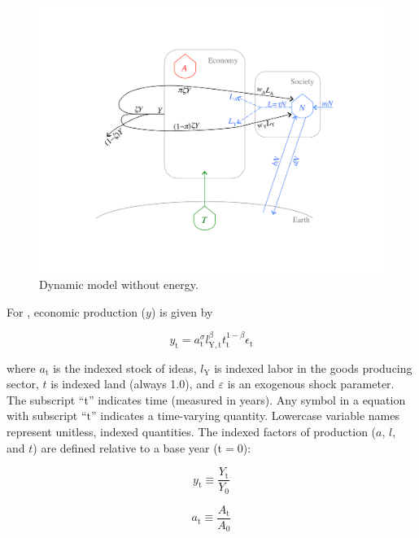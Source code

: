 \documentclass[letterpaper,12pt]{article}
\begin{document}
\begin{figure} \label{fig:ModelWithoutEnergy}
  \begin{center}
    \includegraphics[width=\textwidth]{figure_other/ModelWithoutEnergy.pdf}
    \caption{Dynamic model without energy.}
  \end{center}
\end{figure}

For \citet{Jones:2001wn}, economic production ($y$) is given by

\begin{equation} \label{eq:Jones_production_function}
	y_\mathrm{t} = a_\mathrm{t} ^\sigma l_\mathrm{Y,t} ^\beta t_\mathrm{t} ^{1-\beta} \epsilon_\mathrm{t}
\end{equation}

\noindent where $a_\mathrm{t}$ is the indexed stock of ideas, $l_\mathrm{Y}$ is indexed labor in the goods producing sector, $t$ is indexed land (always 1.0), and $\varepsilon$ is an exogenous shock parameter. The subscript ``t'' indicates time (measured in years). Any symbol in a equation with subscript ``$\mathrm{t}$'' indicates a time-varying quantity. Lowercase variable names represent unitless, indexed quantities. The indexed factors of production ($a$, $l$, and $t$) are defined relative to a base year ($\mathrm{t} = 0$):

\begin{equation} \label{eq:index_y}
	y_\mathrm{t} \equiv \frac{Y_\mathrm{t}}{Y_\mathrm{0}}
\end{equation}

\begin{equation} \label{eq:index_a}
	a_\mathrm{t} \equiv \frac{A_\mathrm{t}}{A_\mathrm{0}}
\end{equation}
\end{document}
